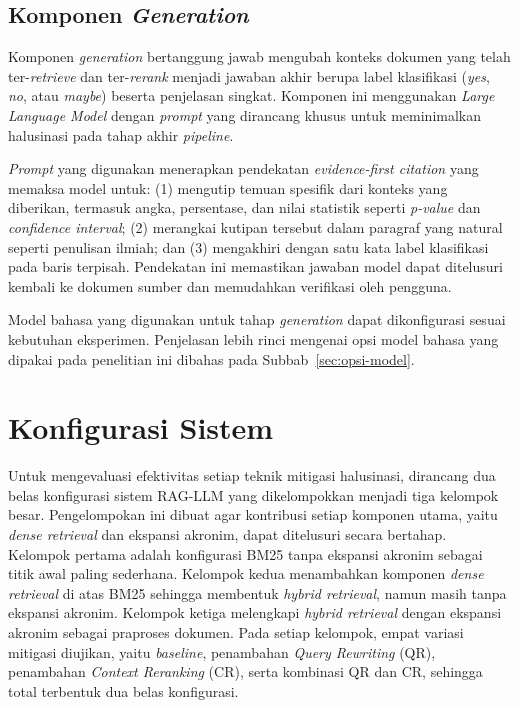 \subsection{Komponen \textit{Generation}}
\label{subsec:komponen-generation}

Komponen \textit{generation} bertanggung jawab mengubah konteks dokumen yang telah ter-\textit{retrieve} dan ter-\textit{rerank} menjadi jawaban akhir berupa label klasifikasi (\textit{yes}, \textit{no}, atau \textit{maybe}) beserta penjelasan singkat. Komponen ini menggunakan \textit{Large Language Model} dengan \textit{prompt} yang dirancang khusus untuk meminimalkan halusinasi pada tahap akhir \textit{pipeline}.

\textit{Prompt} yang digunakan menerapkan pendekatan \textit{evidence-first citation} yang memaksa model untuk: (1) mengutip temuan spesifik dari konteks yang diberikan, termasuk angka, persentase, dan nilai statistik seperti \textit{p-value} dan \textit{confidence interval}; (2) merangkai kutipan tersebut dalam paragraf yang natural seperti penulisan ilmiah; dan (3) mengakhiri dengan satu kata label klasifikasi pada baris terpisah. Pendekatan ini memastikan jawaban model dapat ditelusuri kembali ke dokumen sumber dan memudahkan verifikasi oleh pengguna.

Model bahasa yang digunakan untuk tahap \textit{generation} dapat dikonfigurasi sesuai kebutuhan eksperimen. Penjelasan lebih rinci mengenai opsi model bahasa yang dipakai pada penelitian ini dibahas pada Subbab~\ref{sec:opsi-model}.

\section{Konfigurasi Sistem}
\label{sec:konfigurasi-sistem}

Untuk mengevaluasi efektivitas setiap teknik mitigasi halusinasi, dirancang dua belas konfigurasi sistem RAG-LLM yang dikelompokkan menjadi tiga kelompok besar. Pengelompokan ini dibuat agar kontribusi setiap komponen utama, yaitu \textit{dense retrieval} dan ekspansi akronim, dapat ditelusuri secara bertahap. Kelompok pertama adalah konfigurasi BM25 tanpa ekspansi akronim sebagai titik awal paling sederhana. Kelompok kedua menambahkan komponen \textit{dense retrieval} di atas BM25 sehingga membentuk \textit{hybrid retrieval}, namun masih tanpa ekspansi akronim. Kelompok ketiga melengkapi \textit{hybrid retrieval} dengan ekspansi akronim sebagai praproses dokumen. Pada setiap kelompok, empat variasi mitigasi diujikan, yaitu \textit{baseline}, penambahan \textit{Query Rewriting} (QR), penambahan \textit{Context Reranking} (CR), serta kombinasi QR dan CR, sehingga total terbentuk dua belas konfigurasi.

